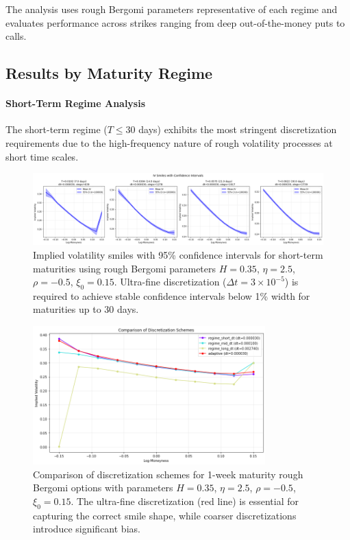 	The analysis uses rough Bergomi parameters representative of each regime and evaluates performance across strikes ranging from deep out-of-the-money puts to calls.
	
	\subsection{Results by Maturity Regime}
	
	\paragraph{Short-Term Regime Analysis}
	
	The short-term regime ($T \leq 30$ days) exhibits the most stringent discretization requirements due to the high-frequency nature of rough volatility processes at short time scales.
	
	\begin{figure}[ht]
		\centering
		\includegraphics[width=\textwidth]{../images/short_regime_discretization_confidence.png}
		\caption{Implied volatility smiles with 95\% confidence intervals for short-term maturities using rough Bergomi parameters $H = 0.35$, $\eta = 2.5$, $\rho = -0.5$, $\xi_0 = 0.15$. Ultra-fine discretization ($\Delta t = 3 \times 10^{-5}$) is required to achieve stable confidence intervals below 1\% width for maturities up to 30 days.}
		\label{fig:discretization-short}
	\end{figure}
	
	\begin{figure}[ht]
		\centering
		\includegraphics[width=0.8\textwidth]{../images/short_regime_discretization_schemes.png}
		\caption{Comparison of discretization schemes for 1-week maturity rough Bergomi options with parameters $H = 0.35$, $\eta = 2.5$, $\rho = -0.5$, $\xi_0 = 0.15$. The ultra-fine discretization (red line) is essential for capturing the correct smile shape, while coarser discretizations introduce significant bias.}
		\label{fig:discretization-schemes-short}
	\end{figure}
	
